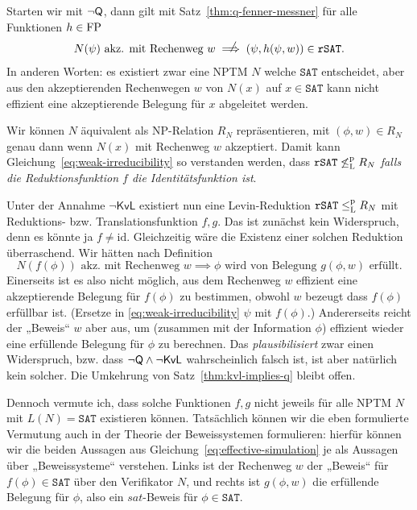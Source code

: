 Starten wir mit $\neg\mathsf{Q}$, dann gilt mit Satz~\ref{thm:q-fenner-messner} für alle Funktionen $h\in\mathrm{FP}$
\begin{equation} N(\psi) \text{ akz. mit Rechenweg $w$} \rlap{\hspace*{2pt}\raisebox{2.3pt}{$\quad\not$}}\implies  (\psi, h(\psi, w))\in\mathtt{rSAT}.\label{eq:weak-irreducibility} \end{equation}
In anderen Worten: es existiert zwar eine NPTM $N$ welche $\mathtt{SAT}$ entscheidet, aber aus den akzeptierenden Rechenwegen $w$ von $N(x)$ auf $x\in \mathtt{SAT}$ kann nicht effizient eine akzeptierende Belegung für $x$ abgeleitet werden.

Wir können $N$ äquivalent als NP-Relation $R_N$ repräsentieren, mit $(\phi, w) \in R_N$ genau dann wenn $N(x)$ mit Rechenweg $w$ akzeptiert.
Damit kann Gleichung~\ref{eq:weak-irreducibility} so verstanden werden, dass $\mathtt{rSAT} \not\leq_\mathrm{L}^\mathrm{p} R_N$ \emph{falls die Reduktionsfunktion $f$ die Identitätsfunktion ist}.

Unter der Annahme $\neg\mathsf{KvL}$ existiert nun eine Levin-Reduktion $\mathtt{rSAT}\leq_\mathrm{L}^\mathrm{p} R_N$ mit Reduktions- bzw. Translationsfunktion $f,g$. Das ist zunächst kein Widerspruch, denn es könnte ja $f\neq\mathrm{id}$.
%
%
Gleichzeitig wäre die Existenz einer solchen Reduktion überraschend. Wir hätten nach Definition
\begin{equation}\label{eq:effective-simulation} N(f(\phi)) \text{ akz. mit Rechenweg $w$} \implies \phi \text{ wird von Belegung $g(\phi, w)$ erfüllt}. \end{equation}
Einerseits ist es also nicht möglich, aus dem Rechenweg $w$ effizient eine akzeptierende Belegung für $f(\phi)$ zu bestimmen, obwohl $w$ bezeugt dass $f(\phi)$ erfüllbar ist. (Ersetze in \eqref{eq:weak-irreducibility} $\psi$ mit $f(\phi)$.)
Andererseits reicht der „Beweis“ $w$ aber aus, um (zusammen mit der Information $\phi$) effizient wieder eine erfüllende Belegung für $\phi$ zu berechnen. 
Das \emph{plausibilisiert} zwar einen Widerspruch, bzw. dass $\neg\mathsf{Q}\land\neg\mathsf{KvL}$ wahrscheinlich falsch ist, ist aber natürlich kein solcher. Die Umkehrung von Satz~\ref{thm:kvl-implies-q} bleibt offen.

Dennoch vermute ich, dass solche Funktionen $f,g$ nicht jeweils für alle NPTM $N$ mit $L(N)=\mathtt{SAT}$ existieren können.
Tatsächlich können wir die eben formulierte Vermutung auch in der Theorie der Beweissystemen formulieren: hierfür können wir die beiden Aussagen aus Gleichung~\ref{eq:effective-simulation} je als Aussagen über „Beweissysteme“ verstehen. Links ist der Rechenweg $w$ der „Beweis“ für $f(\phi)\in \mathtt{SAT}$ über den Verifikator $N$, und rechts ist $g(\phi, w)$ die erfüllende Belegung für $\phi$, also ein $\mathit{sat}$-Beweis für $\phi\in\mathtt{SAT}$.

